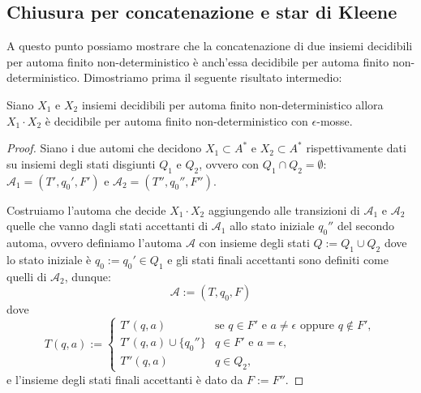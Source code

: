 \subsection{Chiusura per 
concatenazione e star di Kleene}
A questo punto possiamo mostrare che la 
concatenazione di due insiemi decidibili per automa finito 
non-deterministico è anch'essa decidibile per
automa finito non-deterministico.
Dimostriamo prima il seguente risultato intermedio:
\begin{prop}
    Siano $X_1$ e $X_2$ insiemi decidibili per automa finito non-deterministico
    allora $X_1\cdot X_2$ è
decidibile per automa finito non-deterministico con $\epsilon$-mosse.
\begin{proof}
Siano i due automi che decidono $X_1 \subset A^*$ e $X_2 \subset A^*$ rispettivamente dati su insiemi degli stati disgiunti $Q_1$ e $Q_2$, ovvero con $Q_1 \cap Q_2 = \emptyset$: $\mathcal{A}_1 = (T', q_0', F')$ e $\mathcal{A}_2 = (T'', q_0'', F'')$.

Costruiamo l'automa che decide $X_1 \cdot X_2$ aggiungendo alle transizioni di $\mathcal{A}_1$ e $\mathcal{A}_2$ quelle che vanno dagli stati accettanti di $\mathcal{A}_1$ allo stato iniziale $q_0''$ del secondo automa, ovvero definiamo l'automa $\mathcal{A}$ con insieme degli stati $Q := Q_1 \cup Q_2$ dove lo stato iniziale è $q_0 := q_0' \in Q_1$ e gli stati finali accettanti sono definiti come quelli di $\mathcal{A}_2$, dunque:
\[
\mathcal{A} := (T, q_0, F)
\]
dove
\[
T(q,a) :=
\begin{cases}
T'(q,a) & \text{se } q \in F' \text{ e } a \neq \epsilon \text{ oppure } q \notin F', \\
T'(q,a) \cup \{q_0''\} & q \in F' \text{ e } a = \epsilon, \\
T''(q,a) & q \in Q_2,
\end{cases}
\]
e l'insieme degli stati finali accettanti è dato da $F := F''$.
\end{proof} 
\end{prop}
